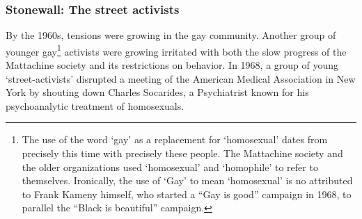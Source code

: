 \subsubsection{Stonewall: The street activists}
\label{stonewall:thestreetactivists}

By the 1960s, tensions were growing in the gay community. Another group of younger gay\footnote{The use of the word `gay' as a replacement for `homosexual' dates from precisely this time with precisely these people. The Mattachine society and the older organizations used `homosexual' and `homophile' to refer to themselves. Ironically, the use of `Gay' to mean `homosexual' is no attributed to Frank Kameny himself, who started a ``Gay is good'' campaign in 1968, to parallel the ``Black is beautiful'' campaign.} activists were growing irritated with both the slow progress of the Mattachine society and its restrictions on behavior. In 1968, a group of young `street-activists' disrupted a meeting of the American Medical Association in New York by shouting down Charles Socarides, a Psychiatrist known for his psychoanalytic treatment of homosexuals.

